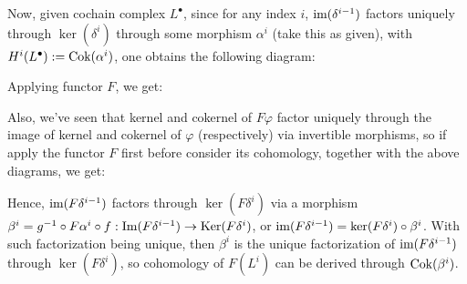 \documentclass{article}
\newcommand{\coker}{\textmd{coker}}
\newcommand{\im}{\textmd{im}}
\newcommand{\Ker}{\textmd{Ker}}
\newcommand{\Cok}{\textmd{Cok}}
\newcommand{\Imag}{\textmd{Im}} %
\begin{document}
Now, given cochain complex $L^\bullet$, since for any index $i$, $\im(\delta^{i-1})$ factors uniquely through $\ker(\delta^i)$ through some morphism $\alpha^i$ (take this as given), with $H^i(L^\bullet) := \Cok(\alpha^i)$, one obtains the following diagram:
\begin{center}
\end{center}
Applying functor $F$, we get:
\begin{center}
\end{center}
Also, we've seen that kernel and cokernel of $F\varphi$ factor uniquely through the image of kernel and cokernel of $\varphi$ (respectively) via invertible morphisms, so if apply the functor $F$ first before consider its cohomology, together with the above diagrams, we get:
\begin{center}
\end{center}
Hence, $\im(F\delta^{i-1})$ factors through $\ker(F\delta^i)$ via a morphism $\beta^i = g^{-1}\circ F\alpha^i \circ f:\Imag(F\delta^{i-1})\rightarrow \Ker(F\delta^i)$, or $\im(F\delta^{i-1})=\ker(F\delta^i)\circ \beta^i$. With such factorization being unique, then $\beta^i$ is the unique factorization of $\im(F\delta^{i-1})$ through $\ker(F\delta^i)$, so cohomology of $F(L^i)$ can be derived through $\Cok(\beta^i)$.
\end{document}
